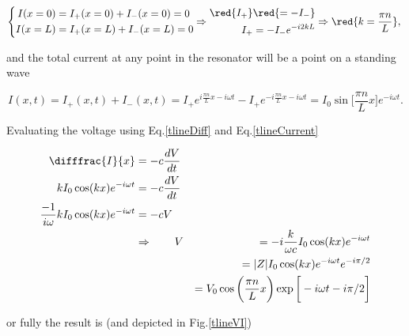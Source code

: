  \begin{equation}
 \left\lbrace \begin{aligned}
 	I(x=0) & = I_{+}(x=0)+I_-(x=0)=0\\
 	I(x=L) & = I_{+}(x=L)+I_-(x=L)=0
 \end{aligned}\Rightarrow\begin{aligned}
 	\red{I_+}&\red{=-I_-}\\
 	I_+&= -I_-e^{-i2kL}
 \end{aligned} \Rightarrow \red{k=\frac{\pi n}{L}},
 \right. 
 \end{equation}
 
 \noindent and the total current at any point in the resonator will be a point on a standing wave
 
 \begin{equation}
	 I(x,t) = I_+(x,t) + I_-(x,t) = I_+e^{i\frac{\pi n}{L}x-i\omega t} - I_+e^{-i\frac{\pi n}{L}x-i\omega t} = {{I_0\sin\bigg[\frac{\pi n}{L}x\bigg]e^{-i\omega t}}}.
	 \label{tlineCurrent}
 \end{equation}
 
 \noindent Evaluating the voltage using Eq.\eqref{tlineDiff} and Eq.\eqref{tlineCurrent}
 
 \begin{equation}
 		\begin{aligned}
	 		\difffrac{I}{x} &= - c\frac{dV}{dt}\\
	 		kI_0\cos(kx)e^{-i\omega t}& =-c\frac{dV}{dt}\\
	 		\frac{-1}{i\omega}kI_0\cos(kx)e^{-i\omega t}& =-cV\\
	 		& \Rightarrow\qquad V &=  -i\frac{k}{\omega c}I_0\cos(kx)e^{-i\omega t}\\
	 		&&=|Z|I_0\cos(kx)e^{-i\omega t}e^{-i\pi/2}\\
	 		&&=V_0\cos \bigg(\frac{\pi n}{L}x\bigg)\exp\bigg[-i\omega t-i\pi/2\bigg]\\
 		\end{aligned}
 \end{equation}
 
 \noindent or fully the result is (and depicted in Fig.\ref{tlineVI})
 

